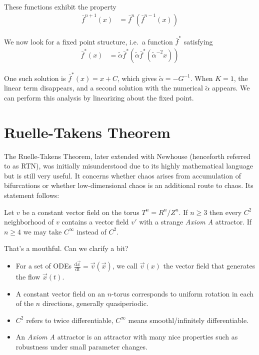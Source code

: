 \documentclass[12pt]{article}
\newcommand{\rd}[2]{\frac{\mathrm{d}#1}{\mathrm{d}#2}}
\begin{document}
These functions exhibit the property
\begin{align}
    \bar{f}^{n+1}(x) &= \bar{f}^n\left( \bar{f}^{n-1}(x) \right)
\end{align}

We now look for a fixed point structure, i.e.\ a function $\bar{f}^*$ satisfying
\begin{align}
    \bar{f}^*(x) &= \tilde{\alpha} \bar{f}^*\left(
        \tilde{\alpha}\bar{f}^*\left( \tilde{\alpha}^{-2}x \right)
    \right)
\end{align}

One such solution is $\bar{f}^*(x) = x + C$, which gives $\tilde{\alpha} =
-G^{-1}$. When $K=1$, the linear term disappears, and a second solution with the
numerical $\tilde{\alpha}$ appears. We can perform this analysis by linearizing
about the fixed point.

\clearpage

\section{Ruelle-Takens Theorem}

The Ruelle-Takens Theorem, later extended with Newhouse (henceforth referred to
as RTN), was initially misunderstood due to its highly mathematical language but
is still very useful. It concerns whether chaos arises from accumulation of
bifurcations or whether low-dimensional chaos is an additional route to chaos.
Its statement follows:
\begin{center}
    Let $v$ be a constant vector field on the torus $T^n = R^n/Z^n$. If $n \geq
    3$ then every $C^2$ neighborhood of $v$ contains a vector field $v'$ with a
    strange \emph{Axiom A} attractor. If $n \geq 4$ we may take $C^{\infty}$
    instead of $C^2$.
\end{center}

That's a mouthful. Can we clarify a bit?
\begin{itemize}
    \item For a set of ODEs $\rd{\vec{x}}{t} = \vec{v}(\vec{x})$, we call
        $\vec{v}(x)$ the vector field that generates the flow $\vec{x}(t)$.

    \item A constant vector field on an $n$-torus corresponds to uniform
        rotation in each of the $n$ directions, generally quasiperiodic.

    \item $C^2$ refers to twice differentiable, $C^\infty$ means
        smoothl/infinitely differentiable.

    \item An \emph{Axiom A} attractor is an attractor with many nice properties
        such as robustness under small parameter changes.
\end{itemize}
\end{document}
